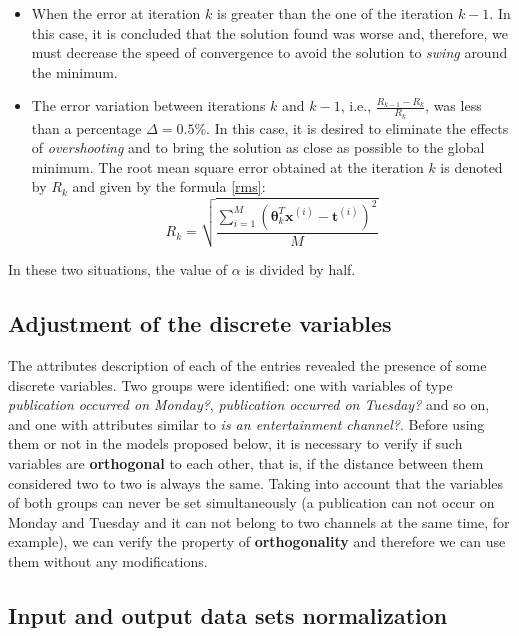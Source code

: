 \documentclass[10pt,twocolumn,letterpaper]{article}
\begin{document}
\begin{itemize}
	\item When the error at iteration \(k\) is greater than the one of the iteration \(k -1\). In this case, it is concluded that the solution found was worse and, therefore, we must decrease the speed of convergence to avoid the solution to \textit{swing} around the minimum.
	\item The error variation between iterations \(k\) and \(k -1\), i.e., \(\frac{R_{k-1} - R_k}{R_k}\), was less than a percentage \(\Delta = 0.5\%\). In this case, it is desired to eliminate the effects of \textit {overshooting} and to bring the solution as close as possible to the global minimum. The root mean square error obtained at the iteration \(k\) is denoted by \(R_k\) and given by the formula \ref {rms}:
	\begin {equation}
	\label{rms}
	R_k = \sqrt{\frac {\sum_{i=1}^{M} \left(\bm{\theta}_k^T\bm{x}^{(i)} - \bm{t}^{(i)}\right)^2}{M}}
	\end{equation}
\end{itemize}

In these two situations, the value of \(\alpha\) is divided by half.

\subsection {Adjustment of the discrete variables}

The attributes description of each of the entries revealed the presence of some discrete variables. Two groups were identified: one with variables of type \textit {publication occurred on Monday?}, \textit {publication occurred on Tuesday?} and so on, and one with attributes similar to \textit{is an entertainment channel?}. Before using them or not in the models proposed below, it is necessary to verify if such variables are \textbf {orthogonal} to each other, that is, if the distance between them considered two to two is always the same. Taking into account that the variables of both groups can never be set simultaneously (a publication can not occur on Monday and Tuesday and it can not belong to two channels at the same time, for example), we can verify the property of \textbf {orthogonality} and therefore we can use them without any modifications.

\subsection {Input and output data sets normalization}
\end{document}
